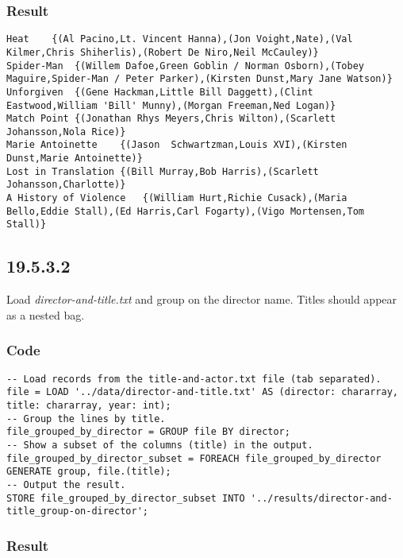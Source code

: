 \documentclass[a4paper, notitlepage]{article}
\begin{document}
\subsubsection{Result}

\begin{lstlisting}
Heat	{(Al Pacino,Lt. Vincent Hanna),(Jon Voight,Nate),(Val Kilmer,Chris Shiherlis),(Robert De Niro,Neil McCauley)}
Spider-Man	{(Willem Dafoe,Green Goblin / Norman Osborn),(Tobey Maguire,Spider-Man / Peter Parker),(Kirsten Dunst,Mary Jane Watson)}
Unforgiven	{(Gene Hackman,Little Bill Daggett),(Clint Eastwood,William 'Bill' Munny),(Morgan Freeman,Ned Logan)}
Match Point	{(Jonathan Rhys Meyers,Chris Wilton),(Scarlett  Johansson,Nola Rice)}
Marie Antoinette	{(Jason  Schwartzman,Louis XVI),(Kirsten Dunst,Marie Antoinette)}
Lost in Translation	{(Bill Murray,Bob Harris),(Scarlett  Johansson,Charlotte)}
A History of Violence	{(William Hurt,Richie Cusack),(Maria Bello,Eddie Stall),(Ed Harris,Carl Fogarty),(Vigo Mortensen,Tom Stall)}
\end{lstlisting}

\subsection{19.5.3.2}

Load \textit{director-and-title.txt} and group on the director name. Titles should appear as a nested bag.

\subsubsection{Code}

\begin{lstlisting}
-- Load records from the title-and-actor.txt file (tab separated).
file = LOAD '../data/director-and-title.txt' AS (director: chararray, title: chararray, year: int);
-- Group the lines by title.
file_grouped_by_director = GROUP file BY director;
-- Show a subset of the columns (title) in the output.
file_grouped_by_director_subset = FOREACH file_grouped_by_director GENERATE group, file.(title);
-- Output the result.
STORE file_grouped_by_director_subset INTO '../results/director-and-title_group-on-director';
\end{lstlisting}

\subsubsection{Result}
\end{document}
